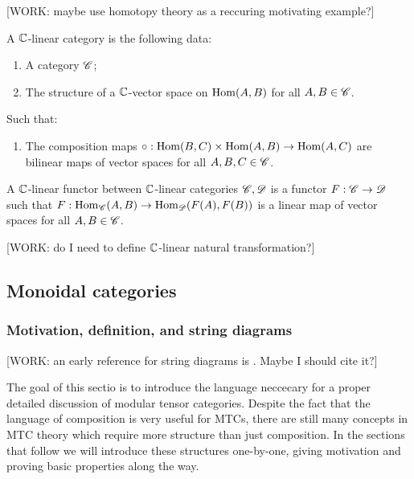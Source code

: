 [WORK: maybe use homotopy theory as a reccuring motivating example?]

\begin{definition} A $\mathbb{C}$-linear category is the following data:

\begin{enumerate}
\item A category $\mathscr{C}$;
\item The structure of a $\mathbb{C}$-vector space on $\operatorname{Hom}(A,B)$ for all $A,B\in \mathscr{C}$.

\end{enumerate}

Such that:

\begin{enumerate}

\item The composition maps $\circ:\operatorname{Hom}(B,C)\times \operatorname{Hom}(A,B)\to \operatorname{Hom}(A,C)$ are bilinear maps of vector spaces for all $A,B,C\in \mathscr{C}$.
\end{enumerate}

\raggedleft\qedsymbol{}
\end{definition}



\begin{definition} A $\mathbb{C}$-linear functor between $\mathbb{C}$-linear categories $\mathscr{C},\mathscr{D}$ is a functor $F:\mathscr{C}\to\mathscr{D}$ such that $F:\operatorname{Hom}_{\mathscr{C}}(A,B)\to\operatorname{Hom}_{\mathscr{D}}(F(A),F(B))$ is a linear map of vector spaces for all $A,B\in\mathscr{C}$.

\raggedleft\qedsymbol{}
\end{definition}


[WORK: do I need to define $\mathbb{C}$-linear natural transformation?]

\subsection{Monoidal categories}

\subsubsection{Motivation, definition, and string diagrams}

[WORK: an early reference for string diagrams is \cite{moussouris1984quantum}. Maybe I should cite it?]

The goal of this sectio is to introduce the language neccecary for a proper detailed discussion of modular tensor categories. Despite the fact that the language of composition is very useful for MTCs, there are still many concepts in MTC theory which require more structure than just composition. In the sections that follow we will introduce these structures one-by-one, giving motivation and proving basic properties along the way.

